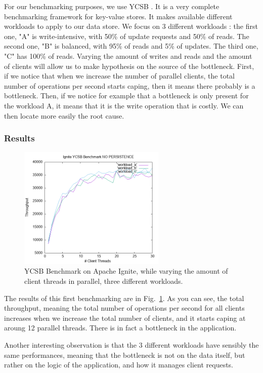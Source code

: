 \documentclass[conference]{IEEEtran}
\begin{document}
For our benchmarking purposes, we use YCSB \cite{YCSB}. It is a very complete benchmarking framework for key-value stores. It makes available different workloads to apply to our data store. We focus on 3 different workloads : the first one, "A" is write-intensive, with 50\% of update requests and 50\% of reads. The second one, "B" is balanced, with 95\% of reads and 5\% of updates. The third one, "C" has 100\% of reads.
Varying the amount of writes and reads and the amount of clients will allow us to make hypothesis on the source of the bottleneck. 
First, if we notice that when we increase the number of parallel clients, the total number of operations per second starts caping, then it means there probably is a bottleneck. Then, if we notice for example that a bottleneck is only present for the workload A, it means that it is the write operation that is costly. We can then locate more easily the root cause.

\subsubsection{Results}

\begin{figure}[!ht]
\centerline{\includegraphics[width=70mm]{coarse_grained.png}}
\caption{YCSB Benchmark on Apache Ignite, while varying the amount of client threads in parallel, three different workloads.}
\label{coarse_grained}
\end{figure}

The results of this first benchmarking are in Fig.~\ref{coarse_grained}.
As you can see, the total throughput, meaning the total number of operations per second for all clients increases when we increase the total number of clients, and it starts caping at aroung 12 parallel threads. There is in fact a bottleneck in the application.

Another interesting observation is that the 3 different workloads have sensibly the same performances, meaning that the bottleneck is not on the data itself, but rather on the logic of the application, and how it manages client requests.
\end{document}
